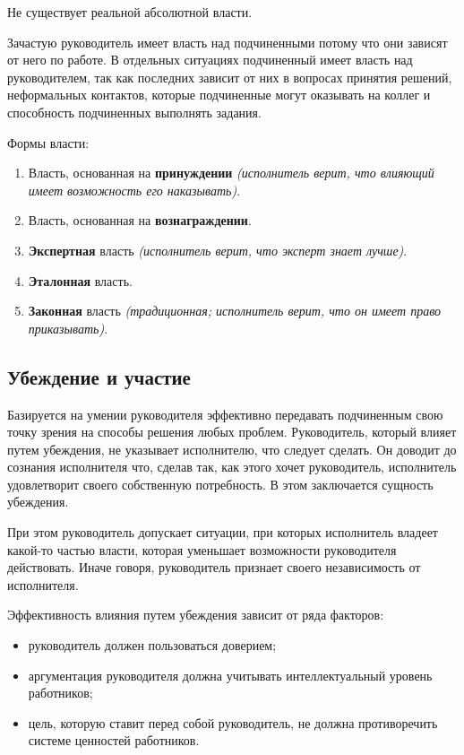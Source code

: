 \documentclass[a4paper,12pt,oneside,final]{extarticle}
\numberwithin{equation}{section}
\begin{document}
Не существует реальной абсолютной власти.

Зачастую руководитель имеет власть над подчиненными потому что они зависят от него по работе. 
В отдельных ситуациях подчиненный имеет власть над руководителем, так как последних зависит от них в вопросах принятия решений, неформальных контактов, которые подчиненные могут оказывать на коллег и способность подчиненных выполнять задания. 

Формы власти:
\begin{enumerate}
	\item Власть, основанная на \textbf{принуждении} \textit{(исполнитель верит, что влияющий имеет возможность его наказывать)}.
	\item Власть, основанная на \textbf{вознаграждении}.
	\item \textbf{Экспертная} власть \textit{(исполнитель верит, что эксперт знает лучше)}.
	\item \textbf{Эталонная} власть.
	\item \textbf{Законная} власть \textit{(традиционная; исполнитель верит, что он имеет право приказывать)}.
\end{enumerate}

\subsection{Убеждение и участие}
Базируется на умении руководителя эффективно передавать подчиненным свою точку зрения на способы решения любых проблем. 
Руководитель, который влияет путем убеждения, не указывает исполнителю, что следует сделать. 
Он доводит до сознания исполнителя что, сделав так, как этого хочет руководитель, исполнитель удовлетворит своего собственную потребность. 
В этом заключается сущность убеждения.

При этом руководитель допускает ситуации, при которых исполнитель владеет какой-то частью власти, которая уменьшает возможности руководителя действовать. Иначе говоря, руководитель признает своего независимость от исполнителя.

Эффективность влияния путем убеждения зависит от ряда факторов:
\begin{itemize}
	\item руководитель должен пользоваться доверием;
	\item аргументация руководителя должна учитывать интеллектуальный уровень работников;
	\item цель, которую ставит перед собой руководитель, не должна противоречить системе ценностей работников.
\end{itemize}
\end{document}
